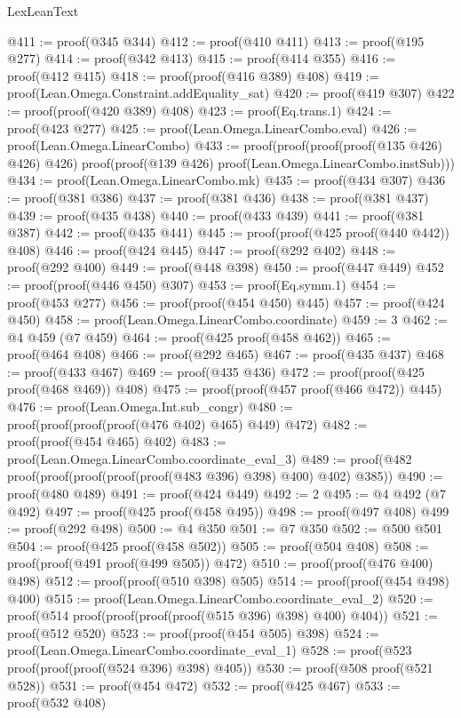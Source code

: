 \begin{lexlean}{LexLeanText}
\begin{coremodule}
@411 := proof(@345 @344)
@412 := proof(@410 @411)
@413 := proof(@195 @277)
@414 := proof(@342 @413)
@415 := proof(@414 @355)
@416 := proof(@412 @415)
@418 := proof(proof(@416 @389) @408)
@419 := proof(Lean.Omega.Constraint.addEquality_sat)
@420 := proof(@419 @307)
@422 := proof(proof(@420 @389) @408)
@423 := proof(Eq.trans.{1})
@424 := proof(@423 @277)
@425 := proof(Lean.Omega.LinearCombo.eval)
@426 := proof(Lean.Omega.LinearCombo)
@433 := proof(proof(proof(proof(@135 @426) @426) @426)
      proof(proof(@139 @426) proof(Lean.Omega.LinearCombo.instSub)))
@434 := proof(Lean.Omega.LinearCombo.mk)
@435 := proof(@434 @307)
@436 := proof(@381 @386)
@437 := proof(@381 @436)
@438 := proof(@381 @437)
@439 := proof(@435 @438)
@440 := proof(@433 @439)
@441 := proof(@381 @387)
@442 := proof(@435 @441)
@445 := proof(proof(@425 proof(@440 @442)) @408)
@446 := proof(@424 @445)
@447 := proof(@292 @402)
@448 := proof(@292 @400)
@449 := proof(@448 @398)
@450 := proof(@447 @449)
@452 := proof(proof(@446 @450) @307)
@453 := proof(Eq.symm.{1})
@454 := proof(@453 @277)
@456 := proof(proof(@454 @450) @445)
@457 := proof(@424 @450)
@458 := proof(Lean.Omega.LinearCombo.coordinate)
@459 := 3
@462 := @4 @459 (@7 @459)
@464 := proof(@425 proof(@458 @462))
@465 := proof(@464 @408)
@466 := proof(@292 @465)
@467 := proof(@435 @437)
@468 := proof(@433 @467)
@469 := proof(@435 @436)
@472 := proof(proof(@425 proof(@468 @469)) @408)
@475 := proof(proof(@457 proof(@466 @472)) @445)
@476 := proof(Lean.Omega.Int.sub_congr)
@480 := proof(proof(proof(proof(@476 @402) @465) @449) @472)
@482 := proof(proof(@454 @465) @402)
@483 := proof(Lean.Omega.LinearCombo.coordinate_eval_3)
@489 := proof(@482 proof(proof(proof(proof(proof(@483 @396) @398) @400) @402) @385))
@490 := proof(@480 @489)
@491 := proof(@424 @449)
@492 := 2
@495 := @4 @492 (@7 @492)
@497 := proof(@425 proof(@458 @495))
@498 := proof(@497 @408)
@499 := proof(@292 @498)
@500 := @4 @350
@501 := @7 @350
@502 := @500 @501
@504 := proof(@425 proof(@458 @502))
@505 := proof(@504 @408)
@508 := proof(proof(@491 proof(@499 @505)) @472)
@510 := proof(proof(@476 @400) @498)
@512 := proof(proof(@510 @398) @505)
@514 := proof(proof(@454 @498) @400)
@515 := proof(Lean.Omega.LinearCombo.coordinate_eval_2)
@520 := proof(@514 proof(proof(proof(proof(@515 @396) @398) @400) @404))
@521 := proof(@512 @520)
@523 := proof(proof(@454 @505) @398)
@524 := proof(Lean.Omega.LinearCombo.coordinate_eval_1)
@528 := proof(@523 proof(proof(proof(@524 @396) @398) @405))
@530 := proof(@508 proof(@521 @528))
@531 := proof(@454 @472)
@532 := proof(@425 @467)
@533 := proof(@532 @408)

\end{coremodule}
\end{lexlean}
